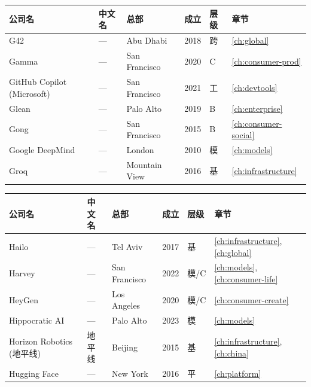 \bigskip

\nopagebreak
\begin{tabularx}{\textwidth}{@{}l X l l l l@{}}
\toprule
\rowcolor{figLightGray}
\textbf{公司名} & \textbf{中文名} & \textbf{总部} & \textbf{成立} & \textbf{层级} & \textbf{章节} \\
\midrule
G42                 & ---             & Abu Dhabi     & 2018 & 跨   & \ref{ch:global} \\
Gamma               & ---             & San Francisco & 2020 & C    & \ref{ch:consumer-prod} \\
GitHub Copilot (Microsoft) & ---     & San Francisco & 2021 & 工   & \ref{ch:devtools} \\
Glean               & ---             & Palo Alto     & 2019 & B    & \ref{ch:enterprise} \\
Gong                & ---             & San Francisco & 2015 & B    & \ref{ch:consumer-social} \\
Google DeepMind     & ---             & London        & 2010 & 模   & \ref{ch:models} \\
Groq                & ---             & Mountain View & 2016 & 基   & \ref{ch:infrastructure} \\
\bottomrule
\end{tabularx}

\bigskip

\nopagebreak
\begin{tabularx}{\textwidth}{@{}l X l l l l@{}}
\toprule
\rowcolor{figLightGray}
\textbf{公司名} & \textbf{中文名} & \textbf{总部} & \textbf{成立} & \textbf{层级} & \textbf{章节} \\
\midrule
Hailo               & ---             & Tel Aviv      & 2017 & 基   & \ref{ch:infrastructure}, \ref{ch:global} \\
Harvey              & ---             & San Francisco & 2022 & 模/C & \ref{ch:models}, \ref{ch:consumer-life} \\
HeyGen              & ---             & Los Angeles   & 2020 & 模/C & \ref{ch:consumer-create} \\
Hippocratic AI      & ---             & Palo Alto     & 2023 & 模   & \ref{ch:models} \\
Horizon Robotics (地平线) & 地平线   & Beijing       & 2015 & 基   & \ref{ch:infrastructure}, \ref{ch:china} \\
Hugging Face        & ---             & New York      & 2016 & 平   & \ref{ch:platform} \\
\bottomrule
\end{tabularx}

